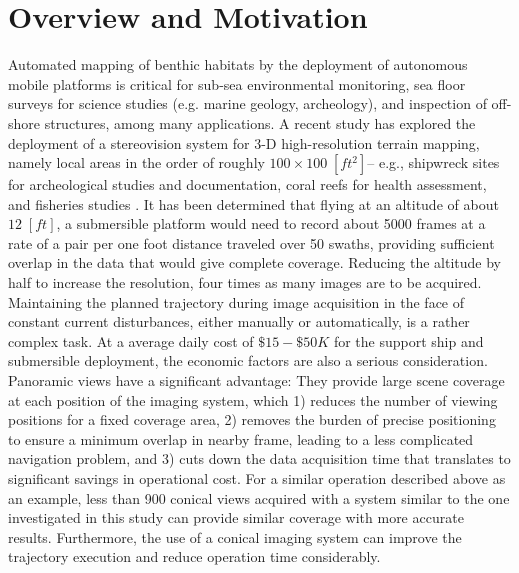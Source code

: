 


\section{Overview and Motivation}

Automated mapping of benthic habitats by the deployment of autonomous mobile platforms is critical
for sub-sea environmental monitoring, sea floor surveys for science studies (e.g. marine geology,
archeology), and inspection of off-shore structures, among many applications. A recent study has
explored the deployment of a stereovision system for 3-D high-resolution terrain mapping, namely
local areas in the order of roughly $100\times 100\;[ft^2]$-- e.g., shipwreck sites for
archeological studies and documentation, coral reefs for health assessment, and fisheries studies
\cite{neg03}. It has been determined that flying at an altitude of about $12\;[ft]$, a submersible
platform would need to record about 5000 frames at a rate of a pair per one foot distance traveled
over 50 swaths, providing sufficient overlap in the data that would give complete coverage.
Reducing the altitude by half to increase the resolution, four times as many images are to be
acquired. Maintaining the planned trajectory during image acquisition in the face of constant
current disturbances, either manually or automatically, is a rather complex task. At a average
daily cost of $\$15-\$50K$ for the support ship and submersible deployment, the economic factors
are also a serious consideration. Panoramic views have a significant advantage: They provide large
scene coverage at each position of the imaging system, which 1) reduces the number of viewing
positions for a fixed coverage area, 2) removes the burden of precise positioning to ensure a
minimum overlap in nearby frame, leading to a less complicated navigation problem, and 3) cuts down
the data acquisition time that translates to significant savings in operational cost. For a similar
operation described above as an example, less than 900 conical views acquired with a system similar
to the one investigated in this study can provide similar coverage with more accurate results.
Furthermore, the use of a conical imaging system can improve the trajectory execution and reduce
operation time considerably.

